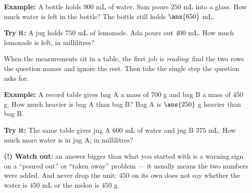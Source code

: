 \documentclass[12pt]{article}
\begin{document}
\begin{examplebox}
\textbf{Example:} A bottle holds $900$ mL of water. Sam pours $250$ mL into a
glass. How much water is left in the bottle?
The bottle still holds $\ans{650}$ mL.
\end{examplebox}

\begin{tryitbox}
\textbf{Try it:} A jug holds $750$ mL of lemonade. Ada pours out $400$ mL. How
much lemonade is left, in millilitres?\\[2pt]
\end{tryitbox}


\begin{formulabox}
When the measurements sit in a table, the first job is \emph{reading}: find the
two rows the question names and ignore the rest. Then take the single step the
question asks for.
\end{formulabox}

\begin{examplebox}
\textbf{Example:} A record table gives bag A a mass of $700$ g and bag B a mass
of $450$ g. How much heavier is bag A than bag B?
Bag A is $\ans{250}$ g heavier than bag B.
\end{examplebox}

\begin{tryitbox}
\textbf{Try it:} The same table gives jug A $600$ mL of water and jug B
$375$ mL. How much more water is in jug A, in millilitres?\\[2pt]
\end{tryitbox}

\begin{watchoutbox}
\textbf{(!) Watch out:} an answer bigger than what you started with is a
warning sign on a ``poured out'' or ``taken away'' problem --- it usually means
the two numbers were added. And never drop the unit: $450$ on its own does not
say whether the water is $450$ mL or the melon is $450$ g.
\end{watchoutbox}
\end{document}
